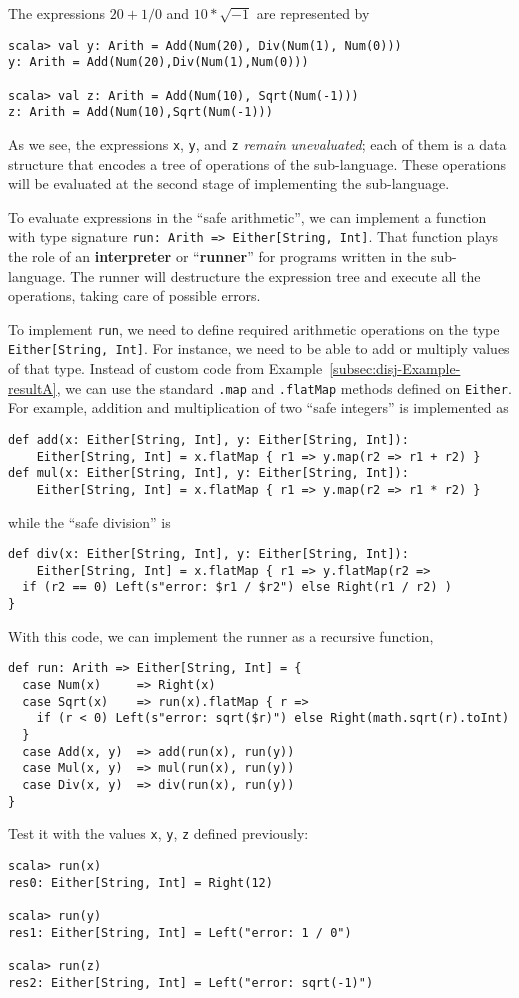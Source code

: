 The expressions $20+1/0$ and $10*\sqrt{-1}$ are represented by
\begin{lstlisting}
scala> val y: Arith = Add(Num(20), Div(Num(1), Num(0)))
y: Arith = Add(Num(20),Div(Num(1),Num(0)))

scala> val z: Arith = Add(Num(10), Sqrt(Num(-1)))
z: Arith = Add(Num(10),Sqrt(Num(-1)))
\end{lstlisting}
As we see, the expressions \lstinline!x!, \lstinline!y!, and \lstinline!z!
\emph{remain} \emph{unevaluated}; each of them is a data structure
that encodes a tree of operations of the sub-language. These operations
will be evaluated at the second stage of implementing the sub-language.

To evaluate expressions in the ``safe arithmetic'', we can implement
a function with type signature \lstinline!run: Arith => Either[String, Int]!.
That function plays the role of an \textbf{interpreter}
or ``\textbf{runner}'' for programs written in the
sub-language. The runner will destructure the expression tree and
execute all the operations, taking care of possible errors. 

To implement \lstinline!run!, we need to define required arithmetic
operations on the type \lstinline!Either[String, Int]!. For instance,
we need to be able to add or multiply values of that type. Instead
of custom code from Example~\ref{subsec:disj-Example-resultA}, we
can use the standard \lstinline!.map! and \lstinline!.flatMap! methods
defined on \lstinline!Either!. For example, addition and multiplication
of two ``safe integers'' is implemented as 
\begin{lstlisting}
def add(x: Either[String, Int], y: Either[String, Int]):
    Either[String, Int] = x.flatMap { r1 => y.map(r2 => r1 + r2) }
def mul(x: Either[String, Int], y: Either[String, Int]):
    Either[String, Int] = x.flatMap { r1 => y.map(r2 => r1 * r2) }
\end{lstlisting}
while the ``safe division'' is
\begin{lstlisting}
def div(x: Either[String, Int], y: Either[String, Int]):
    Either[String, Int] = x.flatMap { r1 => y.flatMap(r2 =>
  if (r2 == 0) Left(s"error: $r1 / $r2") else Right(r1 / r2) )
}
\end{lstlisting}
With this code, we can implement the runner as a recursive function,
\begin{lstlisting}
def run: Arith => Either[String, Int] = {
  case Num(x)     => Right(x)
  case Sqrt(x)    => run(x).flatMap { r =>
    if (r < 0) Left(s"error: sqrt($r)") else Right(math.sqrt(r).toInt)
  }
  case Add(x, y)  => add(run(x), run(y))
  case Mul(x, y)  => mul(run(x), run(y))
  case Div(x, y)  => div(run(x), run(y))
}
\end{lstlisting}
Test it with the values \lstinline!x!, \lstinline!y!, \lstinline!z!
defined previously:
\begin{lstlisting}
scala> run(x)
res0: Either[String, Int] = Right(12)

scala> run(y)
res1: Either[String, Int] = Left("error: 1 / 0")

scala> run(z)
res2: Either[String, Int] = Left("error: sqrt(-1)")
\end{lstlisting}


